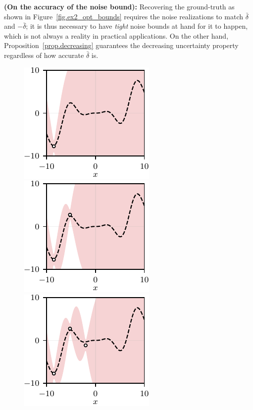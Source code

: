 \begin{remark}
	\textbf{(On the accuracy of the noise bound):}
	Recovering the ground-truth as shown in Figure~\ref{fig.ex2_opt_bounds} requires the noise realizations to match $\bar \delta$ and $-\bar \delta$; it is thus necessary to have \textit{tight} noise bounds at hand for it to happen, which is not always a reality in practical applications. On the other hand, Proposition~\ref{prop.decreasing} guarantees the decreasing uncertainty property regardless of how accurate $\bar \delta$ is.
\end{remark}

\begin{figure}[h]
	\centering
	\vspace{10pt}
	\includegraphics{../images/chap2_ex3_opt_bounds_A.pdf} 
	\includegraphics{../images/chap2_ex3_opt_bounds_B.pdf} 
	\includegraphics{../images/chap2_ex3_opt_bounds_C.pdf}  \\[4pt]

\end{figure}
